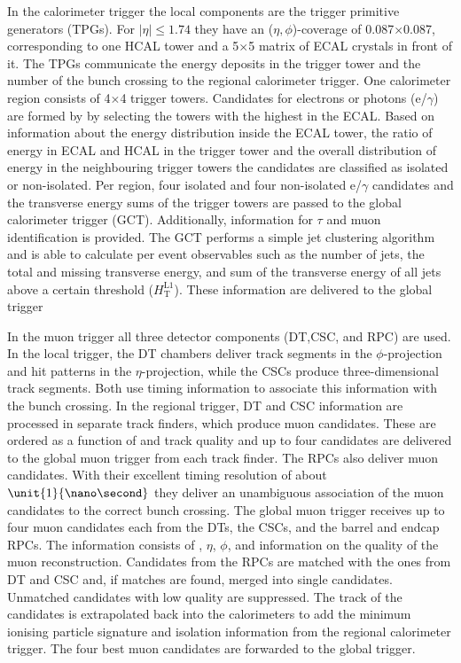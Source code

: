 In the calorimeter trigger the local components are the trigger primitive generators (TPGs). For $\vert \eta \vert \leq 1.74$ they have an ($\eta,\phi$)-coverage of 0.087$\times$0.087, corresponding to one HCAL tower and a 5$\times$5 matrix of ECAL crystals in front of it. The TPGs communicate the energy deposits in the trigger tower and the number of the bunch crossing to the regional calorimeter trigger. One calorimeter region consists of 4$\times$4 trigger towers. Candidates for electrons or photons (e/$\gamma$) are formed by by selecting the towers with the highest \Et in the ECAL. Based on information about the energy distribution inside the ECAL tower, the ratio of energy in ECAL and HCAL in the trigger tower and the overall distribution of energy in the neighbouring trigger towers the candidates are classified as isolated or non-isolated. Per region, four isolated and four non-isolated e/$\gamma$ candidates and the transverse energy sums of the trigger towers are passed to the global calorimeter trigger (GCT). Additionally, information for $\tau$ and muon identification is provided. The GCT performs a simple jet clustering algorithm and is able to calculate per event observables such as the number of jets, the total and missing transverse energy, and sum of the transverse energy of all jets above a certain threshold ($H_{\mathrm{T}}^{\mathrm{L1}}$). These information are delivered to the global trigger

In the muon trigger all three detector components (DT,CSC, and RPC) are used. In the local trigger, the DT chambers deliver track segments in the $\phi$-projection and hit patterns in the $\eta$-projection, while the CSCs produce three-dimensional track segments. Both use timing information to associate this information with the bunch crossing. In the regional trigger, DT and CSC information are processed in separate track finders, which produce muon candidates. These are ordered as a function of \pt and track quality and up to four candidates are delivered to the global muon trigger from each track finder. The RPCs also deliver muon candidates. With their excellent timing resolution of about $\unit{1}{\nano\second}$ they deliver an unambiguous association of the muon candidates to the correct bunch crossing. The global muon trigger receives up to four muon candidates each from the DTs, the CSCs, and the barrel and endcap RPCs. The information consists of \pt, $\eta$, $\phi$, and information on the quality of the muon reconstruction. Candidates from the RPCs are matched with the ones from DT and CSC and, if matches are found, merged into single candidates. Unmatched candidates with low quality are suppressed. The track of the candidates is extrapolated back into the calorimeters to add the minimum ionising particle signature and isolation information from the regional calorimeter trigger. The four best muon candidates are forwarded to the global trigger. 

